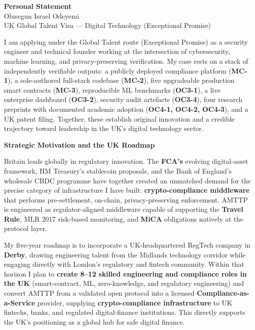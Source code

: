 \documentclass[12pt,a4paper]{article}
\begin{document}
\begin{center}
{\Large\bfseries Personal Statement}\\[4pt]
{\large Olusegun Israel Odeyemi}\\[2pt]
{\normalsize UK Global Talent Visa --- Digital Technology (Exceptional Promise)}
\end{center}

\bigskip

I am applying under the Global Talent route (Exceptional Promise) as a security engineer and technical founder working at the intersection of cybersecurity, machine learning, and privacy-preserving verification. My case rests on a stack of independently verifiable outputs: a publicly deployed compliance platform (\textbf{MC-1}), a sole-authored full-stack codebase (\textbf{MC-2}), five upgradeable production smart contracts (\textbf{MC-3}), reproducible ML benchmarks (\textbf{OC3-1}), a live enterprise dashboard (\textbf{OC3-2}), security audit artefacts (\textbf{OC3-4}), four research preprints with documented academic adoption (\textbf{OC4-1, OC4-2, OC4-3}), and a UK patent filing. Together, these establish original innovation and a credible trajectory toward leadership in the UK's digital technology sector.

\textbf{Strategic Motivation and the UK Roadmap}

Britain leads globally in regulatory innovation. The \textbf{FCA's} evolving digital-asset framework, HM Treasury's stablecoin proposals, and the Bank of England's wholesale CBDC programme have together created an unmatched demand for the precise category of infrastructure I have built: \textbf{crypto-compliance middleware} that performs pre-settlement, on-chain, privacy-preserving enforcement. AMTTP is engineered as regulator-aligned middleware capable of supporting the \textbf{Travel Rule}, MLR 2017 risk-based monitoring, and \textbf{MiCA} obligations natively at the protocol layer.

My five-year roadmap is to incorporate a UK-headquartered RegTech company in \textbf{Derby}, drawing engineering talent from the Midlands technology corridor while engaging directly with London's regulatory and fintech community. Within that horizon I plan to \textbf{create 8--12 skilled engineering and compliance roles in the UK} (smart-contract, ML, zero-knowledge, and regulatory engineering) and convert AMTTP from a validated open protocol into a licensed \textbf{Compliance-as-a-Service} provider, supplying \textbf{crypto-compliance infrastructure} to UK fintechs, banks, and regulated digital-finance institutions. This directly supports the UK's positioning as a global hub for safe digital finance.
\end{document}
